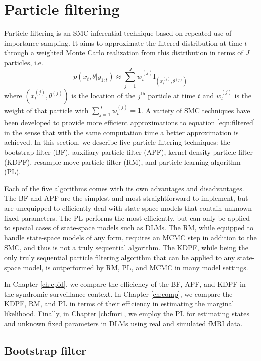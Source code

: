 \section{Particle filtering \label{sec:filtering}}

Particle filtering is an SMC inferential technique based on repeated use of importance sampling. It aims to approximate the filtered distribution at time $t$ through a weighted Monte Carlo realization from this distribution in terms of $J$ particles, i.e.
\begin{equation}
p(x_t,\theta| y_{1:t}) \approx \sum_{j=1}^J w_t^{(j)} \mbox{I}_{\left(x_t^{(j)},\theta^{(j)}\right)} \label{eqn:approx}
\end{equation}
where $\left(x_t^{(j)},\theta^{(j)}\right)$ is the location of the $j^{\mbox{th}}$ particle at time $t$ and $w_t^{(j)}$ is the weight of that particle with $\sum_{j=1}^J w_t^{(j)}=1$. A variety of SMC techniques have been developed to provide more efficient approximations to equation \eqref{eqn:filtered} in the sense that with the same computation time a better approximation is achieved. In this section, we describe five particle filtering techniques: the bootstrap filter (BF), auxiliary particle filter (APF), kernel density particle filter (KDPF), resample-move particle filter (RM), and particle learning algorithm (PL).

Each of the five algorithms comes with its own advantages and disadvantages. The BF and APF are the simplest and most straightforward to implement, but are unequipped to efficiently deal with state-space models that contain unknown fixed parameters. The PL performs the most efficiently, but can only be applied to special cases of state-space models such as DLMs. The RM, while equipped to handle state-space models of any form, requires an MCMC step in addition to the SMC, and thus is not a truly sequential algorithm. The KDPF, while being the only truly sequential particle filtering algorithm that can be applied to any state-space model, is outperformed by RM, PL, and MCMC in many model settings.

In Chapter \ref{ch:epid}, we compare the efficiency of the BF, APF, and KDPF in the syndromic surveillance context. In Chapter \ref{ch:comp}, we compare the KDPF, RM, and PL in terms of their efficiency in estimating the marginal likelihood. Finally, in Chapter \ref{ch:fmri}, we employ the PL for estimating states and unknown fixed parameters in DLMs using real and simulated fMRI data.

\subsection{Bootstrap filter \label{sec:bf}}

